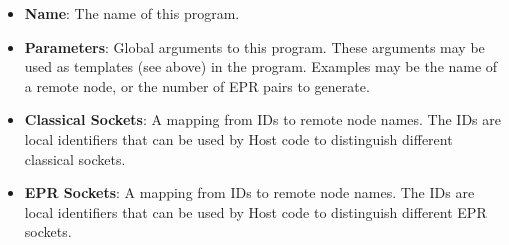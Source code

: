 \begin{itemize}
    \item \textbf{Name}: The name of this program.
    \item \textbf{Parameters}: Global arguments to this program. These arguments may be used as templates (see above) in the program. Examples may be the name of a remote node, or the number of EPR pairs to generate.
    \item \textbf{Classical Sockets}: A mapping from IDs to remote node names. The IDs are local identifiers that can be used by Host code to distinguish different classical sockets.
    \item \textbf{EPR Sockets}: A mapping from IDs to remote node names. The IDs are local identifiers that can be used by Host code to distinguish different EPR sockets.
\end{itemize}



